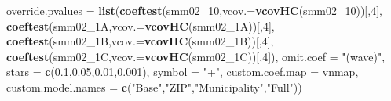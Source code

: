 \documentclass[
]{article}
\newenvironment{Shaded}{\begin{snugshade}}{\end{snugshade}}
\newcommand{\DataTypeTok}[1]{\textcolor[rgb]{0.13,0.29,0.53}{#1}}
\newcommand{\DecValTok}[1]{\textcolor[rgb]{0.00,0.00,0.81}{#1}}
\newcommand{\FloatTok}[1]{\textcolor[rgb]{0.00,0.00,0.81}{#1}}
\newcommand{\KeywordTok}[1]{\textcolor[rgb]{0.13,0.29,0.53}{\textbf{#1}}}
\newcommand{\NormalTok}[1]{#1}
\newcommand{\StringTok}[1]{\textcolor[rgb]{0.31,0.60,0.02}{#1}}
\begin{document}
\begin{Shaded}
\begin{Highlighting}[]
          \DataTypeTok{override.pvalues =} \KeywordTok{list}\NormalTok{(}\KeywordTok{coeftest}\NormalTok{(smm02_}\DecValTok{10}\NormalTok{,}\DataTypeTok{vcov.=}\KeywordTok{vcovHC}\NormalTok{(smm02_}\DecValTok{10}\NormalTok{))[,}\DecValTok{4}\NormalTok{],}
                                  \KeywordTok{coeftest}\NormalTok{(smm02_1A,}\DataTypeTok{vcov.=}\KeywordTok{vcovHC}\NormalTok{(smm02_1A))[,}\DecValTok{4}\NormalTok{],}
                                  \KeywordTok{coeftest}\NormalTok{(smm02_1B,}\DataTypeTok{vcov.=}\KeywordTok{vcovHC}\NormalTok{(smm02_1B))[,}\DecValTok{4}\NormalTok{],}
                                  \KeywordTok{coeftest}\NormalTok{(smm02_1C,}\DataTypeTok{vcov.=}\KeywordTok{vcovHC}\NormalTok{(smm02_1C))[,}\DecValTok{4}\NormalTok{]),}
          \DataTypeTok{omit.coef =} \StringTok{"(wave)"}\NormalTok{, }\DataTypeTok{stars =} \KeywordTok{c}\NormalTok{(}\FloatTok{0.1}\NormalTok{,}\FloatTok{0.05}\NormalTok{,}\FloatTok{0.01}\NormalTok{,}\FloatTok{0.001}\NormalTok{), }\DataTypeTok{symbol =} \StringTok{"+"}\NormalTok{,}
          \DataTypeTok{custom.coef.map =}\NormalTok{ vnmap, }
          \DataTypeTok{custom.model.names =} \KeywordTok{c}\NormalTok{(}\StringTok{"Base"}\NormalTok{,}\StringTok{"ZIP"}\NormalTok{,}\StringTok{"Municipality"}\NormalTok{,}\StringTok{"Full"}\NormalTok{))}
\end{Highlighting}
\end{Shaded}
\end{document}
